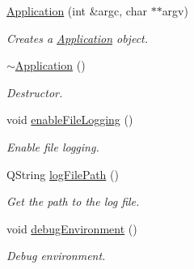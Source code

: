 \begin{DoxyCompactItemize}
\item 
\hyperlink{class_mdt_1_1_application_a5038a26f5618eba0c6f8c51e7eca76dd}{Application} (int \&argc, char $\ast$$\ast$argv)\hypertarget{class_mdt_1_1_application_a5038a26f5618eba0c6f8c51e7eca76dd}{}\label{class_mdt_1_1_application_a5038a26f5618eba0c6f8c51e7eca76dd}

\begin{DoxyCompactList}\small\item\em Creates a \hyperlink{class_mdt_1_1_application}{Application} object. \end{DoxyCompactList}\item 
\hyperlink{class_mdt_1_1_application_a24456c7eb1e79fa5c73459f1c64f7e84}{$\sim$\+Application} ()\hypertarget{class_mdt_1_1_application_a24456c7eb1e79fa5c73459f1c64f7e84}{}\label{class_mdt_1_1_application_a24456c7eb1e79fa5c73459f1c64f7e84}

\begin{DoxyCompactList}\small\item\em Destructor. \end{DoxyCompactList}\item 
void \hyperlink{class_mdt_1_1_application_ab16dbd8818c2bf6e0c82208b3f5c829b}{enable\+File\+Logging} ()
\begin{DoxyCompactList}\small\item\em Enable file logging. \end{DoxyCompactList}\item 
Q\+String \hyperlink{class_mdt_1_1_application_a8531dd25ea6a6dba62f1bcaea89723a7}{log\+File\+Path} ()\hypertarget{class_mdt_1_1_application_a8531dd25ea6a6dba62f1bcaea89723a7}{}\label{class_mdt_1_1_application_a8531dd25ea6a6dba62f1bcaea89723a7}

\begin{DoxyCompactList}\small\item\em Get the path to the log file. \end{DoxyCompactList}\item 
void \hyperlink{class_mdt_1_1_application_a055baa70e5c4f78c2472ca39755aa111}{debug\+Environment} ()
\begin{DoxyCompactList}\small\item\em Debug environment. \end{DoxyCompactList}\end{DoxyCompactItemize}
